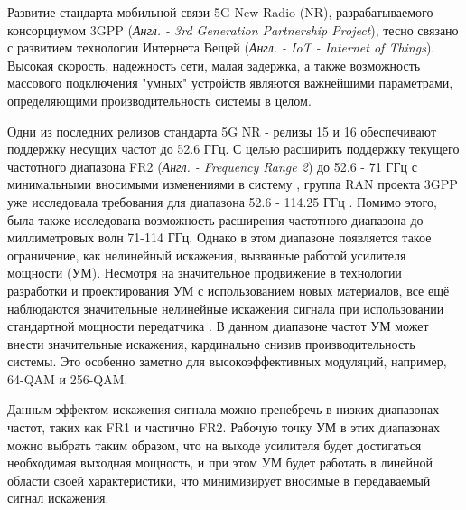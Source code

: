 \documentclass{unn}
\begin{document}
\maketitle
\newpage
\Introduction

Развитие стандарта мобильной связи 5G New Radio (NR), разрабатываемого консорциумом
3GPP (\textit{Англ. - 3rd Generation Partnership Project}), тесно связано с развитием
технологии Интернета Вещей (\textit{Англ. - IoT - Internet of Things}). Высокая скорость,
надежность сети, малая задержка, а также возможность массового подключения
"умных" устройств являются важнейшими параметрами, определяющими
производительность системы в целом.

Одни из последних релизов стандарта 5G NR - релизы 15 и 16 обеспечивают
поддержку несущих частот до 52.6 ГГц. С целью расширить поддержку текущего
частотного диапазона FR2 (\textit{Англ. - Frequency Range 2}) до 52.6 - 71 ГГц с
минимальными вносимыми изменениями в систему \cite{intel193259}
\cite{qlcm193229}, группа RAN проекта 3GPP уже исследовала требования для
диапазона 52.6 - 114.25 ГГц \cite{3gpp.38.807}. Помимо этого, была также
исследована возможность расширения частотного диапазона до миллиметровых
волн 71-114 ГГц. Однако в этом диапазоне появляется такое ограничение, как
нелинейный искажения, вызванные работой усилителя мощности (УМ). Несмотря
на значительное продвижение в технологии разработки и проектирования УМ с
использованием новых материалов, все ещё наблюдаются значительные нелинейные
искажения сигнала при использовании стандартной мощности передатчика
\cite{zhang2021}. В данном диапазоне частот УМ может внести значительные
искажения, кардинально снизив производительность
системы. Это особенно заметно для высокоэффективных модуляций, например,
64-QAM и 256-QAM.

Данным эффектом искажения сигнала можно пренебречь в низких диапазонах
частот, таких как FR1 и частично FR2. Рабочую точку УМ в этих диапазонах
можно выбрать таким образом, что на выходе усилителя будет достигаться
необходимая выходная мощность, и при этом УМ будет работать в линейной
области своей характеристики, что минимизирует вносимые в передаваемый
сигнал искажения.
\end{document}
